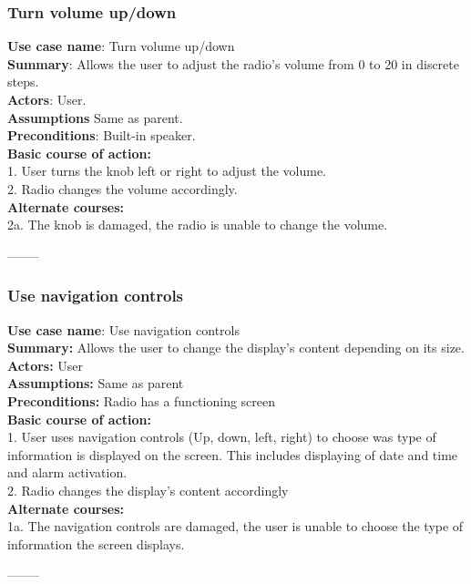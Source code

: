 \documentclass[11pt]{article}
\begin{document}
\subsubsection{Turn volume up/down}
\textbf{Use case name}: Turn volume up/down\\
\textbf{Summary}: Allows the user to adjust the radio's volume from 0 to 20 in discrete steps.\\
\textbf{Actors}: User.\\
\textbf{Assumptions}  Same as parent.\\
\textbf{Preconditions}: Built-in speaker.\\
\textbf{Basic course of action:}\\
\hspace*{10mm}1. User turns the knob left or right to adjust the volume.\\
\hspace*{10mm}2. Radio changes the volume accordingly.\\
\textbf{Alternate courses:}\\
\hspace*{10mm}2a. The knob is damaged, the radio is unable to change the volume.
\begin{center}--------\end{center}

\subsubsection{Use navigation controls}
\textbf{Use case name}: Use navigation controls\\
\textbf{Summary:} Allows the user to change the display's content depending on its size.\\
\textbf{Actors:} User\\
\textbf{Assumptions:} Same as parent\\
\textbf{Preconditions:} Radio has a functioning screen\\
\textbf{Basic course of action:}\\
\hspace*{10mm}1. User uses navigation controls (Up, down, left, right) to choose was type of information is displayed on the screen. This includes displaying of date and time and alarm activation.\\
\hspace*{10mm}2. Radio changes the display's content accordingly\\
\textbf{Alternate courses:}\\
\hspace*{10mm}1a. The navigation controls are damaged, the user is unable to choose the type of information the screen displays.
\begin{center}--------\end{center}
\end{document}
